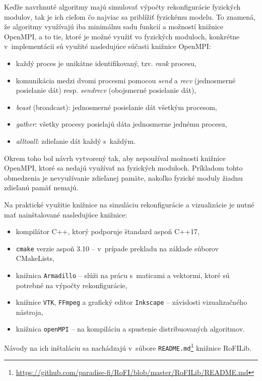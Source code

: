 \documentclass[
  printed, %
  oneside, %
  notable,   %
  nolof,     %
  nolot,     %
]{fithesis3}
\begin{document}
Keďže navrhnuté algoritmy majú simulovať výpočty rekonfigurácie fyzických modulov, tak je ich cieľom čo najviac sa priblížiť fyzickému modelu. To znamená, že algoritmy využívajú iba minimálnu sadu funkcií a možností knižnice OpenMPI, a to tie, ktoré je možné využiť vo fyzických moduloch, konkrétne v~implementácii sú využité nasledujúce súčasti knižnice OpenMPI: 
\begin{itemize}
    \item každý proces je unikátne identifikovaný, tzv. \textit{rank} procesu, 
    \item komunikácia medzi dvomi procesmi pomocou \textit{send} a \textit{recv} (jednosmerné posielanie dát) resp. \textit{sendrecv} (obojsmerné posielanie dát), 
    \item \textit{bcast} (broadcast): jednosmerné posielanie dát všetkým procesom, 
    \item \textit{gather}: všetky procesy posielajú dáta jednosmerne jednému procesu, 
    \item \textit{alltoall}: zdieľanie dát každý s~každým. 
\end{itemize}

Okrem toho bol návrh vytvorený tak, aby nepoužíval možnosti knižnice OpenMPI, ktoré sa nedajú využívať na fyzických moduloch. Príkladom tohto obmedzenia je nevyužívanie zdieľanej pamäte, nakoľko fyzické moduly žiadnu zdieľanú pamäť nemajú. 

Na praktické využitie knižnice na simuláciu rekonfigurácie a vizualizácie je nutné mať nainštalované nasledujúce knižnice: 
\begin{itemize}
    \item kompilátor C++, ktorý podporuje štandard aspoň C++17, 
    \item \texttt{cmake} verzie aspoň 3.10 -- v~prípade prekladu na základe súborov CMakeLists, 
    \item knižnica \texttt{Armadillo} -- slúži na prácu s~maticami a vektormi, ktoré sú potrebné na výpočty rekonfigurácie,  
    \item knižnice \texttt{VTK}, \texttt{FFmpeg} a grafický editor \texttt{Inkscape} -- závislosti vizualizačného nástroja, 
    \item knižnica \texttt{openMPI} -- na kompiláciu a spustenie distribuovaných algoritmov. 
\end{itemize}

 Návody na ich inštaláciu sa nachádzajú v~súbore \texttt{README.md}\footnote{\url{https://github.com/paradise-fi/RoFI/blob/master/RoFILib/README.md}} knižnice RoFILib. 
\end{document}
